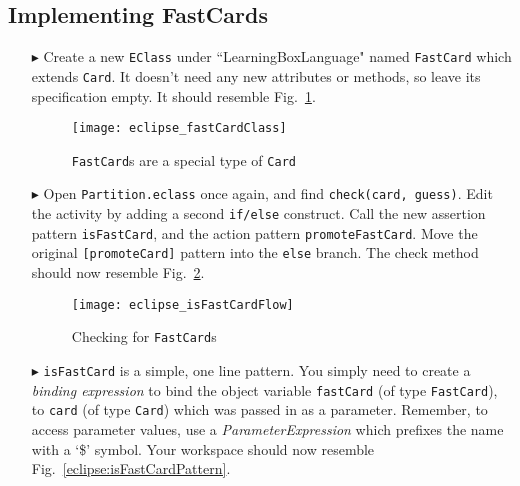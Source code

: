 \newpage
\subsection{Implementing FastCards}
\texHeader
\hypertarget{fastCard tex}{}

\begin{itemize}
  
\item[$\blacktriangleright$] Create a new \texttt{EClass} under
``LearningBoxLanguage" named \texttt{FastCard} which extends \texttt{Card}. It doesn't need any new attributes or methods, so leave its specification empty. It should resemble Fig.~\ref{eclipse:fastClass}.

\vspace{0.5cm}

\begin{figure}[htp] 
\begin{center}
  \texttt{[image: eclipse\_fastCardClass]}
  \caption{\texttt{FastCard}s are a special type of \texttt{Card}}
  \label{eclipse:fastClass}
\end{center}
\end{figure}

\item[$\blacktriangleright$] Open \texttt{Partition.eclass} once again, and find \texttt{check(card, guess)}. Edit the activity by adding a second
\texttt{if/else} construct. Call the new assertion pattern \texttt{isFastCard}, and the action pattern \texttt{promoteFastCard}. Move the original
\texttt{[promoteCard]} pattern into the \texttt{else} branch. The check method should now resemble Fig.~\ref{eclipse:isFastCard}.

\vspace{0.5cm}

\begin{figure}[htp]
\begin{center}
  \texttt{[image: eclipse\_isFastCardFlow]}
  \caption{Checking for \texttt{FastCard}s}
  \label{eclipse:isFastCard}
\end{center}
\end{figure}

\item[$\blacktriangleright$] \texttt{isFastCard} is a simple, one line pattern. You simply need to create a \emph{binding expression} to bind the
object variable \texttt{fastCard} (of type \texttt{FastCard}), to \texttt{card} (of type \texttt{Card}) which was passed in as a parameter. Remember, to access
parameter values, use a \emph{ParameterExpression} which prefixes the name with a `\$' symbol. Your workspace should now resemble
Fig.~\ref{eclipse:isFastCardPattern}.


\end{itemize}
